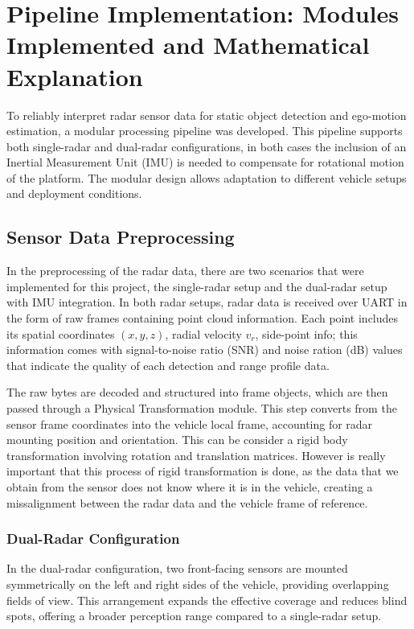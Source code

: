 
\section{Pipeline Implementation: Modules Implemented and Mathematical Explanation}
\label{sec:Mathematical Models and Algorithms for Radar-Based Object Detection}

To reliably interpret radar sensor data for static object detection and ego-motion estimation, a modular processing pipeline was developed. 
This pipeline supports both single-radar and dual-radar configurations, in both cases the inclusion of an Inertial Measurement Unit (IMU) is needed to compensate for rotational motion of the platform. 
The modular design allows adaptation to different vehicle setups and deployment conditions.

\subsection*{Sensor Data Preprocessing}
In the preprocessing of the radar data, there are two scenarios that were implemented for this project, the single-radar setup and the dual-radar setup with IMU integration.
In both radar setups, radar data is received over UART in the form of raw frames containing point cloud information. 
Each point includes its spatial coordinates $(x, y, z)$, radial velocity $v_r$, side-point info; this information comes with signal-to-noise ratio (SNR) and noise ration (dB) values that indicate the quality of each detection and range profile data.

The raw bytes are decoded \cite{understanding_uart} and structured into frame objects, which are then passed through a Physical Transformation module. 
This step converts from the sensor frame coordinates into the vehicle local frame, accounting for radar mounting position and orientation. 
This can be consider a rigid body transformation involving rotation and translation matrices.
However is really important that this process of rigid transformation is done, as the data that we obtain from the sensor does not know where it is in the vehicle, creating a missalignment between the radar data and the vehicle frame of reference.

\subsubsection*{Dual-Radar Configuration}
In the dual-radar configuration, two front-facing sensors are mounted symmetrically on the left and right sides of the vehicle, providing overlapping fields of view. 
This arrangement expands the effective coverage and reduces blind spots, offering a broader perception range compared to a single-radar setup.  

